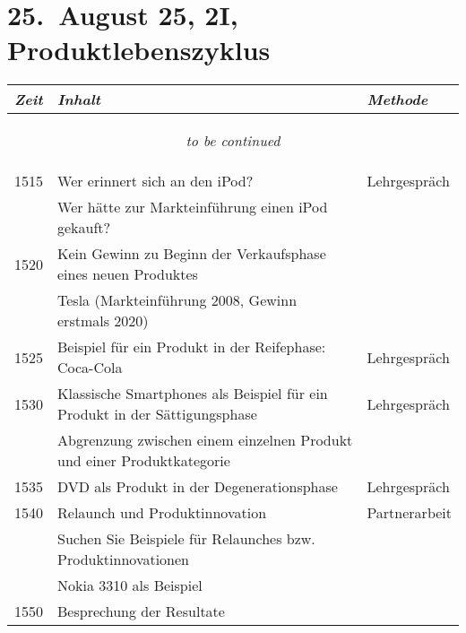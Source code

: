 \documentclass[a4paper]{scrreprt}
\begin{document}
\section*{25.\ August 25, 2I, Produktlebenszyklus}
\begin{longtable}{p{1.5cm}>{\RaggedRight}p{7.5cm}p{2.5cm}}
    \toprule
    \emph{Zeit}&\emph{Inhalt}&\emph{Methode}\\
    \midrule
    \endhead

    \midrule
    \multicolumn{3}{c}{\begin{tiny}\textit{to be continued}\end{tiny}}\\
    \midrule
    \endfoot

    \bottomrule
    \endlastfoot

    1515&Wer erinnert sich an den iPod?&Lehrgespräch\\
        &Wer hätte zur Markteinführung einen iPod gekauft?&\\
    1520&Kein Gewinn zu Beginn der Verkaufsphase eines neuen
    Produktes&\\
        &Tesla (Markteinführung 2008, Gewinn erstmals 2020)&\\ [5pt]

    1525&Beispiel für ein Produkt in der Reifephase:
    Coca-Cola&Lehrgespräch\\ [5pt]

    1530&Klassische Smartphones als Beispiel für ein Produkt in der
    Sättigungsphase&Lehrgespräch\\
        &Abgrenzung zwischen einem einzelnen Produkt und einer
        Produktkategorie&\\ [5pt]

    1535&DVD als Produkt in der Degenerationsphase&Lehrgespräch\\ [5pt]

    1540&Relaunch und Produktinnovation&Partnerarbeit\\
        &Suchen Sie Beispiele für Relaunches bzw. Produktinnovationen&\\
        &Nokia 3310 als Beispiel&\\
    1550&Besprechung der Resultate&\\

\end{longtable}
\end{document}
